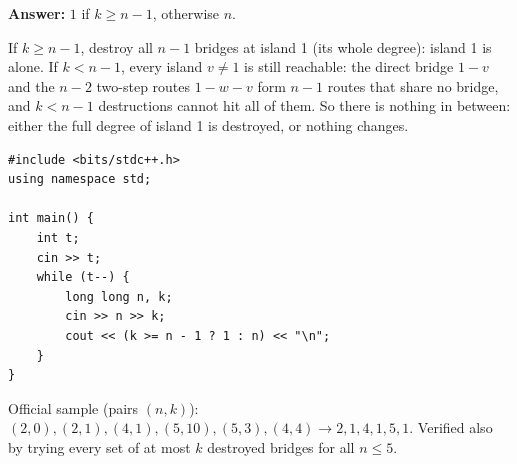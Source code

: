 \begin{solutionbox}
\textbf{Answer:} $1$ if $k \ge n-1$, otherwise $n$.

If $k \ge n-1$, destroy all $n-1$ bridges at island 1 (its whole degree): island 1 is alone. If $k < n-1$, every island $v \ne 1$ is still reachable: the direct bridge $1{-}v$ and the $n-2$ two-step routes $1{-}w{-}v$ form $n-1$ routes that share no bridge, and $k < n-1$ destructions cannot hit all of them. So there is nothing in between: either the full degree of island 1 is destroyed, or nothing changes.

\begin{center}
\end{center}

\begin{lstlisting}[style=cpp]
#include <bits/stdc++.h>
using namespace std;

int main() {
    int t;
    cin >> t;
    while (t--) {
        long long n, k;
        cin >> n >> k;
        cout << (k >= n - 1 ? 1 : n) << "\n";
    }
}
\end{lstlisting}
Official sample (pairs $(n,k)$): $(2,0),(2,1),(4,1),(5,10),(5,3),(4,4) \to 2, 1, 4, 1, 5, 1$. Verified also by trying every set of at most $k$ destroyed bridges for all $n \le 5$.
\end{solutionbox}

